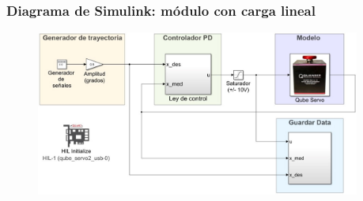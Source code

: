 \begin{frame}
\begin{figure}
     \end{figure}
\end{frame}

\begin{frame}
\frametitle{Diagrama de Simulink: módulo con carga lineal}
\begin{figure}
\centering
\includegraphics[width=0.95\textwidth]{simulink_qube_disk.jpeg}
\end{figure}

\end{frame}

